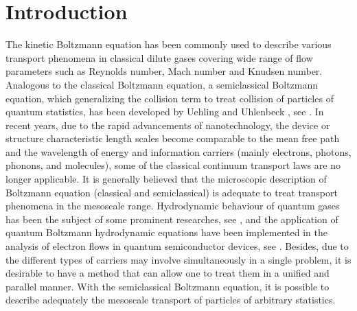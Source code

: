 \documentclass{rsproca}%
\begin{document}



\maketitle

\section{Introduction}
\label{sec:1}

The kinetic Boltzmann equation has been commonly used to describe various transport phenomena in classical dilute gases covering wide range of flow parameters such as Reynolds number, Mach number and Knudsen number.   Analogous to the classical Boltzmann equation, a semiclassical Boltzmann equation, which generalizing the collision term to treat collision of particles of quantum statistics, has been developed by Uehling and Uhlenbeck \cite{PhysRev.43.552}, see \cite{KadanoffBaym,PhysRev.43.552}.
In recent years, due to the rapid advancements of nanotechnology, the device or structure characteristic length scales become comparable to the mean free path and the wavelength of energy and information carriers (mainly electrons, photons, phonons, and molecules), some of the classical continuum transport laws are no longer applicable.   It is generally believed that the microscopic description of Boltzmann equation (classical and semiclassical) is adequate to treat transport phenomena in the mesoscale range.  Hydrodynamic behaviour of quantum gases has been the subject of some prominent researches, see \cite{nikuni98,PhysRev.40.749,PhysRevB.35.7959}, and the application of quantum Boltzmann hydrodynamic equations have been implemented in the analysis of electron flows in quantum semiconductor devices, see \cite{Gardner1994,PhysRevB.39.9536,Woolard5146296}.  Besides, due to the different types of carriers may involve simultaneously in a single problem, it is desirable to have a method that can allow one to treat them in a unified and parallel manner.   With the semiclassical Boltzmann equation, it is possible to describe adequately the mesoscale transport of particles of arbitrary statistics.
\end{document}
